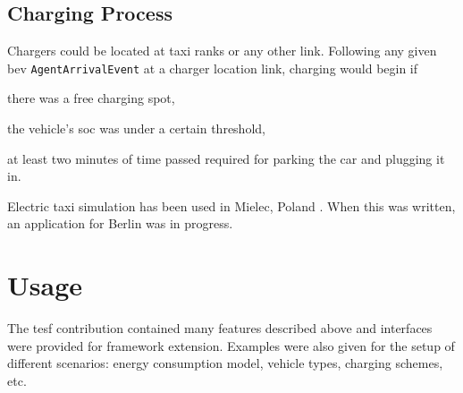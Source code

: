 \subsection{Charging Process}
Chargers could be located at taxi ranks or any other link. 
Following any given \gls{bev} \lstinline$AgentArrivalEvent$ at a charger location link, charging would begin if
%
\begin{compactitem}
	\item there was a free charging spot,
	\item the vehicle's \gls{soc} was under a certain threshold,
	\item at least two minutes of time passed required for parking the car and plugging it in.
\end{compactitem}

Electric taxi simulation has been used in Mielec, Poland \citep[][]{Bischoff2013MaTaxis, BischoffMaciejewskiEcabMielecMobilTUM}. When this was written, an application for Berlin was in progress.

\section{Usage}
The \gls{tesf} \gls{contribution} contained many features described above and interfaces were provided for framework extension. 
Examples were also given for the setup of different scenarios: \eg energy consumption model, vehicle types, charging schemes, etc.


